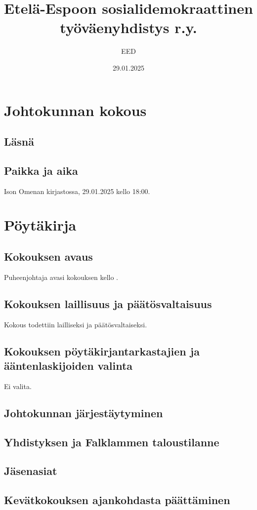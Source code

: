 \documentclass[a4paper,12pt]{article}
\title{Etelä-Espoon sosialidemokraattinen työväenyhdistys r.y.}
\author{EED}
\date{29.01.2025}
\begin{document}
\maketitle
\tableofcontents
\section*{Johtokunnan kokous}
\subsection*{Läsnä}
\begin{flushleft}
\end{flushleft}
\subsection*{Paikka ja aika}
Ison Omenan kirjastossa, 29.01.2025 kello 18:00.
\section*{Pöytäkirja}
\subsection{Kokouksen avaus}
Puheenjohtaja avasi kokouksen kello .
\subsection{Kokouksen laillisuus ja päätösvaltaisuus}
Kokous todettiin lailliseksi ja päätösvaltaiseksi.
\subsection{Kokouksen pöytäkirjantarkastajien ja ääntenlaskijoiden valinta}
Ei valita.
\subsection{Johtokunnan järjestäytyminen}
\subsection{Yhdistyksen ja Falklammen taloustilanne}
\subsection{Jäsenasiat}
\subsection{Kevätkokouksen ajankohdasta päättäminen}
\end{document}
